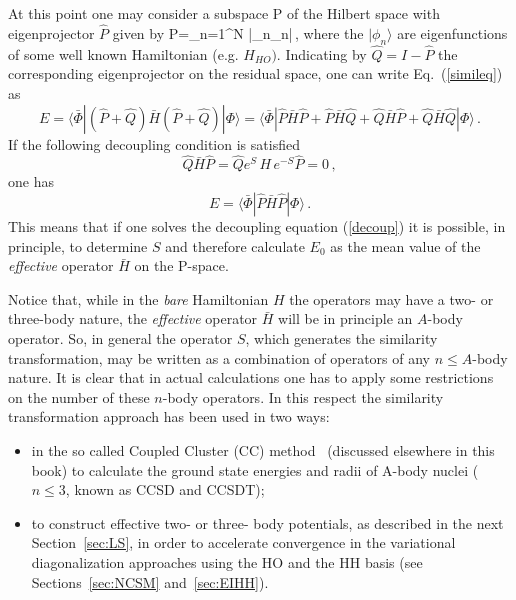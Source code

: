 At this point one may consider a subspace P of the  Hilbert space  with  eigenprojector $\hat P$ given by 
\be
\hat P=\sum_{n=1}^N |\phi_n\rangle\langle\phi_n|\,, 
\ee 
where the $|\phi_n\rangle$ are eigenfunctions of some well known Hamiltonian (e.g. $H_{HO})$.
Indicating by $\hat Q=I-\hat P$ the corresponding eigenprojector on the  residual space, one can write Eq.~(\ref{simileq})
as 
\begin{equation}
E=\langle \bar\Phi|(\hat P + \hat Q){\bar H}(\hat P + \hat Q) |\Phi\rangle =
\langle \bar\Phi|\hat P{\bar H}\hat P+\hat P{\bar H}\hat Q+\hat Q{\bar H}\hat P+\hat Q{\bar H}\hat Q|\Phi\rangle\,.
\end{equation}
If  the following decoupling condition is satisfied
\begin{equation}
 \hat Q{\bar H}\hat P = \hat Q e^{S}\, H\,e^{-S}\hat P = 0\,,
\label{decoup}
\end{equation}
one has
\begin{equation}
E=\langle \bar\Phi|\hat P{\bar H}\hat P|\Phi\rangle\,.
\end{equation} 
This means that if one solves the decoupling equation (\ref{decoup}) it is possible, in principle, to determine $S$ and therefore
calculate $E_0$ as the mean value of the {\it effective} operator ${\bar H}$ on the P-space.  

Notice that, while in the {\it bare} Hamiltonian $H$ the operators may have  a two- or three-body nature, the  
{\it effective} operator ${\bar H}$ will be in principle an $A$-body operator. So, in general the operator $S$, 
which generates the similarity transformation, may be written as a combination of operators of any $n\leq A$-body nature. 
It is clear that in actual calculations one has to apply some restrictions on the number of these $n$-body
operators. In this respect the similarity transformation approach has been used in two ways: 
\begin{itemize}
 \item  in the so called Coupled Cluster (CC) method~\cite{Zab:1978,HJ:2004}  (discussed elsewhere in this book) 
 to calculate the ground state energies and radii of A-body nuclei ($n\leq 3$, known as CCSD and CCSDT);
 \item to construct effective two- or three- body potentials, as described in the next Section~\ref{sec:LS},
 in order to accelerate convergence in the variational diagonalization approaches using the  HO  
and the HH basis (see Sections~\ref{sec:NCSM} and~\ref{sec:EIHH}).
\end{itemize}


